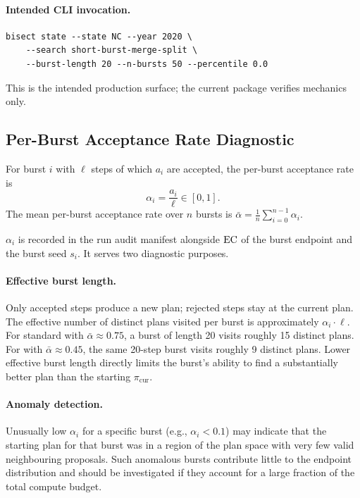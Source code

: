 \paragraph{Intended CLI invocation.}
\begin{verbatim}
bisect state --state NC --year 2020 \
    --search short-burst-merge-split \
    --burst-length 20 --n-bursts 50 --percentile 0.0
\end{verbatim}
This is the intended production surface; the current package verifies mechanics
only.

\subsection{Per-Burst Acceptance Rate Diagnostic}
\label{subsec:alg-acceptance}

\begin{definition}
\label{def:alpha-burst}
For burst $i$ with $\ell$ steps of which $a_i$ are accepted, the per-burst
acceptance rate is
\[
  \alpha_i = \frac{a_i}{\ell} \in [0,1].
\]
The mean per-burst acceptance rate over $n$ bursts is
$\bar\alpha = \frac{1}{n}\sum_{i=0}^{n-1} \alpha_i$.
\end{definition}

$\alpha_i$ is recorded in the run audit manifest alongside $\mathrm{EC}$ of the
burst endpoint and the burst seed $s_i$.
It serves two diagnostic purposes.

\paragraph{Effective burst length.}
Only accepted steps produce a new plan; rejected steps stay at the current
plan.
The effective number of distinct plans visited per burst is approximately
$\alpha_i \cdot \ell$.
For standard \sburst{} with $\bar\alpha \approx 0.75$, a burst of length 20
visits roughly 15 distinct plans.
For \sbf{} with $\bar\alpha \approx 0.45$, the same 20-step burst visits
roughly 9 distinct plans.
Lower effective burst length directly limits the burst's ability to find
a substantially better plan than the starting $\pi_{\mathrm{cur}}$.

\paragraph{Anomaly detection.}
Unusually low $\alpha_i$ for a specific burst (e.g., $\alpha_i < 0.1$)
may indicate that the starting plan for that burst was in a region of the
plan space with very few valid neighbouring proposals.
Such anomalous bursts contribute little to the endpoint distribution and
should be investigated if they account for a large fraction of the total
compute budget.

